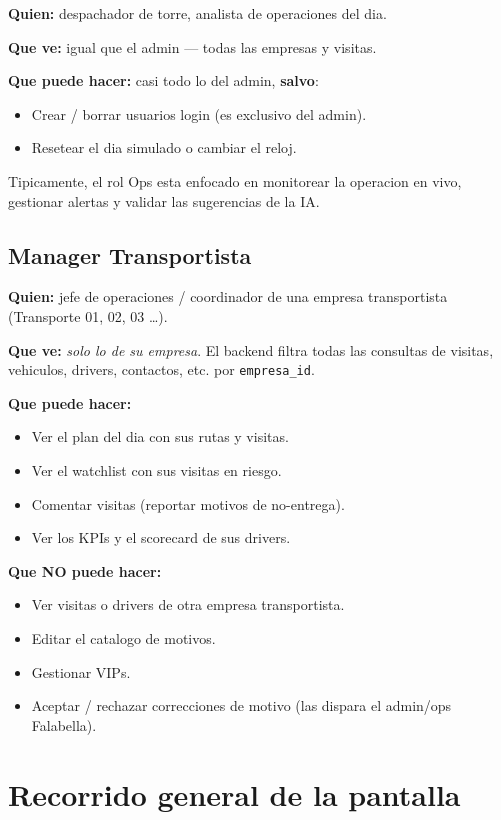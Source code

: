 \documentclass[11pt,a4paper]{article}
\begin{document}
\textbf{Quien:} despachador de torre, analista de operaciones del dia.

\textbf{Que ve:} igual que el admin --- todas las empresas y visitas.

\textbf{Que puede hacer:} casi todo lo del admin, \textbf{salvo}:
\begin{itemize}
  \item Crear / borrar usuarios login (es exclusivo del admin).
  \item Resetear el dia simulado o cambiar el reloj.
\end{itemize}

Tipicamente, el rol Ops esta enfocado en monitorear la operacion en
vivo, gestionar alertas y validar las sugerencias de la IA.

\subsection{Manager Transportista}

\textbf{Quien:} jefe de operaciones / coordinador de una empresa
transportista (Transporte 01, 02, 03 \dots).

\textbf{Que ve:} \textit{solo lo de su empresa}. El backend filtra
todas las consultas de visitas, vehiculos, drivers, contactos, etc.
por \texttt{empresa\_id}.

\textbf{Que puede hacer:}
\begin{itemize}
  \item Ver el plan del dia con sus rutas y visitas.
  \item Ver el watchlist con sus visitas en riesgo.
  \item Comentar visitas (reportar motivos de no-entrega).
  \item Ver los KPIs y el scorecard de sus drivers.
\end{itemize}

\textbf{Que NO puede hacer:}
\begin{itemize}
  \item Ver visitas o drivers de otra empresa transportista.
  \item Editar el catalogo de motivos.
  \item Gestionar VIPs.
  \item Aceptar / rechazar correcciones de motivo (las dispara el
        admin/ops Falabella).
\end{itemize}

\section{Recorrido general de la pantalla}
\end{document}
